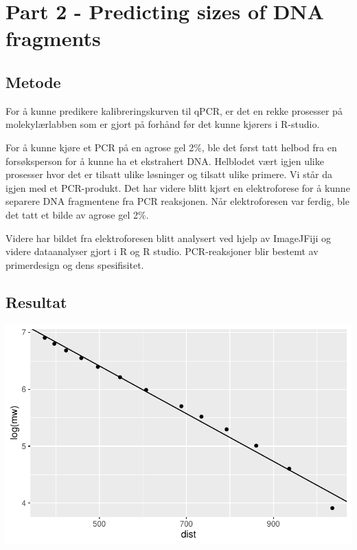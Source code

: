 \documentclass[
  letterpaper,
  DIV=11,
  numbers=noendperiod]{scrreprt}
\begin{document}
\section{Part 2 - Predicting sizes of DNA
fragments}\label{part-2---predicting-sizes-of-dna-fragments}

\subsection{Metode}\label{metode-2}

For å kunne predikere kalibreringskurven til qPCR, er det en rekke
prosesser på molekylærlabben som er gjort på forhånd før det kunne
kjørers i R-studio.

For å kunne kjøre et PCR på en agrose gel 2\%, ble det først tatt helbod
fra en forsøksperson for å kunne ha et ekstrahert DNA. Helblodet vært
igjen ulike prosesser hvor det er tilsatt ulike løsninger og tilsatt
ulike primere. Vi står da igjen med et PCR-produkt. Det har videre blitt
kjørt en elektroforese for å kunne separere DNA fragmentene fra PCR
reaksjonen. Når elektroforesen var ferdig, ble det tatt et bilde av
agrose gel 2\%.

Videre har bildet fra elektroforesen blitt analysert ved hjelp av
ImageJFiji og videre dataanalyser gjort i R og R studio. PCR-reaksjoner
blir bestemt av primerdesign og dens spesifisitet.

\subsection{Resultat}\label{resultat-2}

\includegraphics{02-regression-models_files/figure-pdf/unnamed-chunk-3-1.pdf}
\end{document}
